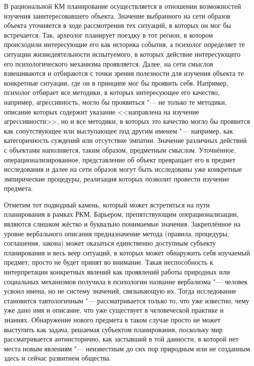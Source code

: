 \documentclass[a4paper, 12pt]{article}
\theoremstyle{plain}
\begin{document}
	В рациональной КМ планирование осуществляется в отношении возможностей изучения заинтересовавшего объекта. Значение выбранного на сети образов объекта уточняется в ходе рассмотрения тех ситуаций, в которых он мог бы встречается. Так, археолог планирует поездку в тот регион, в котором происходили интересующие его как историка события, а психолог определяет те ситуации жизнедеятельности испытуемого, в которых действие интересующего его психологического механизма проявляется. Далее, на сети смыслов взвешиваются и отбираются с точки зрения полезности для изучения объекта те конкретные ситуации, где он в принципе мог бы проявить себя. Например, психолог отбирает все методики, в которых интересующее его качество, например, агрессивность, могло бы проявиться "--- не только те методики, описание которых содержит указание <<направлена на изучение агрессивности>>, но и все методики, в которых это качество могло бы проявится как сопутствующее или выступающее под другим именем "--- например, как категоричность суждений или отсутствие эмпатии. Значение различных действий с объектами наполняется, таким образом, предметным смыслом. Уточнённое, операционализированное, представление об объект превращает его в предмет исследования и далее на сети образов могут быть исследованы уже конкретные эмпирические процедуры, реализация которых позволит провести изучение предмета.
	
	Отметим тот подводный камень, который может встретиться на пути планирования в рамках РКМ. Барьером, препятствующим операционализации, являются слишком жёстко и буквально понимаемые значения. Закреплённое на уровне вербального описания предназначение метода (правила, процедуры, соглашения, закона) может оказаться единственно доступным субъекту планирования и весь веер ситуаций, в которых может обнаружить себя изучаемый предмет, просто не будет принят во внимание. Такая неспособность к интерпретации конкретных явлений как проявлений работы природных или социальных механизмов получила в психологии название вербализма "--- человек усвоил имена, но не систему значений, связывающую их. Тогда исследование становится тавтологичным "--- рассматривается только то, что уже известно, чему уже дано имя и описание, что уже существует в человеческой практике и знаниях. Обнаружение нового предмета в таком случае просто не может выступить как задача, решаемая субъектом планирования, поскольку мир рассматривается антиисторично, как застывший в той данности, в которой нет места новым явлениям "--- неизвестным до сих пор природным или не созданным здесь и сейчас развитием общества.
	
\end{document}
